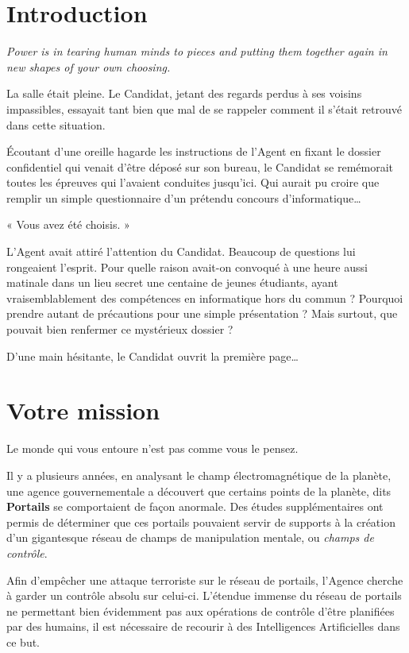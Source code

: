 \section{Introduction}

\emph{Power is in tearing human minds to pieces and putting them together again
in new shapes of your own choosing.}

\vspace{1cm}

La salle était pleine. Le Candidat, jetant des regards perdus à ses voisins
impassibles, essayait tant bien que mal de se rappeler comment il s'était
retrouvé dans cette situation.

Écoutant d'une oreille hagarde les instructions de l'Agent en fixant le dossier
confidentiel qui venait d'être déposé sur son bureau, le Candidat se remémorait
toutes les épreuves qui l'avaient conduites jusqu'ici. Qui aurait pu croire que
remplir un simple questionnaire d'un prétendu concours
d'informatique\ldots

« Vous avez été choisis. »

L'Agent avait attiré l'attention du Candidat. Beaucoup de questions lui
rongeaient l'esprit. Pour quelle raison avait-on convoqué à une heure aussi
matinale dans un lieu secret une centaine de jeunes étudiants, ayant
vraisemblablement des compétences en informatique hors du commun ? Pourquoi
prendre autant de précautions pour une simple présentation ? Mais surtout, que
pouvait bien renfermer ce mystérieux dossier ?

D'une main hésitante, le Candidat ouvrit la première page\ldots

\newpage

\section{Votre mission}

Le monde qui vous entoure n'est pas comme vous le pensez.

Il y a plusieurs années, en analysant le champ électromagnétique de la planète,
une agence gouvernementale a découvert que certains points de la planète, dits
\textbf{Portails} se comportaient de façon anormale.
Des études supplémentaires ont permis de déterminer que ces portails pouvaient
servir de supports à la création d'un gigantesque réseau de champs de
manipulation mentale, ou \emph{champs de contrôle}.

Afin d'empêcher une attaque terroriste sur le réseau de portails, l'Agence
cherche à garder un contrôle absolu sur celui-ci. L'étendue immense du réseau
de portails ne permettant bien évidemment pas aux opérations de contrôle d'être
planifiées par des humains, il est nécessaire de recourir à des Intelligences
Artificielles dans ce but.

